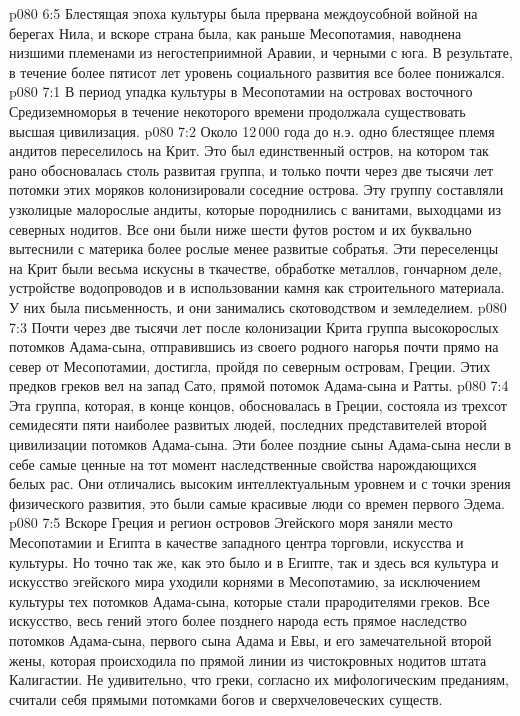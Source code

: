 \vs p080 6:5 Блестящая эпоха культуры была прервана междоусобной войной на берегах Нила, и вскоре страна была, как раньше Месопотамия, наводнена низшими племенами из негостеприимной Аравии, и черными с юга. В результате, в течение более пятисот лет уровень социального развития все более понижался.
\vs p080 7:1 В период упадка культуры в Месопотамии на островах восточного Средиземноморья в течение некоторого времени продолжала существовать высшая цивилизация.
\vs p080 7:2 Около 12\,000 года до н.э. одно блестящее племя андитов переселилось на Крит. Это был единственный остров, на котором так рано обосновалась столь развитая группа, и только почти через две тысячи лет потомки этих моряков колонизировали соседние острова. Эту группу составляли узколицые малорослые андиты, которые породнились с ванитами, выходцами из северных нодитов. Все они были ниже шести футов ростом и их буквально вытеснили с материка более рослые менее развитые собратья. Эти переселенцы на Крит были весьма искусны в ткачестве, обработке металлов, гончарном деле, устройстве водопроводов и в использовании камня как строительного материала. У них была письменность, и они занимались скотоводством и земледелием.
\vs p080 7:3 Почти через две тысячи лет после колонизации Крита группа высокорослых потомков Адама\hyp{}сына, отправившись из своего родного нагорья почти прямо на север от Месопотамии, достигла, пройдя по северным островам, Греции. Этих предков греков вел на запад Сато, прямой потомок Адама\hyp{}сына и Ратты.
\vs p080 7:4 Эта группа, которая, в конце концов, обосновалась в Греции, состояла из трехсот семидесяти пяти наиболее развитых людей, последних представителей второй цивилизации потомков Адама\hyp{}сына. Эти более поздние сыны Адама\hyp{}сына несли в себе самые ценные на тот момент наследственные свойства нарождающихся белых рас. Они отличались высоким интеллектуальным уровнем и с точки зрения физического развития, это были самые красивые люди со времен первого Эдема.
\vs p080 7:5 \pc Вскоре Греция и регион островов Эгейского моря заняли место Месопотамии и Египта в качестве западного центра торговли, искусства и культуры. Но точно так же, как это было и в Египте, так и здесь вся культура и искусство эгейского мира уходили корнями в Месопотамию, за исключением культуры тех потомков Адама\hyp{}сына, которые стали прародителями греков. Все искусство, весь гений этого более позднего народа есть прямое наследство потомков Адама\hyp{}сына, первого сына Адама и Евы, и его замечательной второй жены, которая происходила по прямой линии из чистокровных нодитов штата Калигастии. Не удивительно, что греки, согласно их мифологическим преданиям, считали себя прямыми потомками богов и сверхчеловеческих существ.
